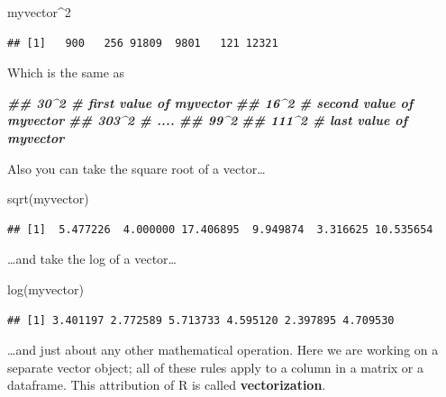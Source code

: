 \documentclass[
]{book}
\newenvironment{Shaded}{\begin{snugshade}}{\end{snugshade}}
\newcommand{\DecValTok}[1]{\textcolor[rgb]{0.00,0.00,0.81}{#1}}
\newcommand{\DocumentationTok}[1]{\textcolor[rgb]{0.56,0.35,0.01}{\textbf{\textit{#1}}}}
\newcommand{\FunctionTok}[1]{\textcolor[rgb]{0.00,0.00,0.00}{#1}}
\newcommand{\NormalTok}[1]{#1}
\newcommand{\SpecialCharTok}[1]{\textcolor[rgb]{0.00,0.00,0.00}{#1}}
\begin{document}
\begin{Shaded}
\begin{Highlighting}[]
\NormalTok{myvector}\SpecialCharTok{\^{}}\DecValTok{2}
\end{Highlighting}
\end{Shaded}

\begin{verbatim}
## [1]   900   256 91809  9801   121 12321
\end{verbatim}

Which is the same as

\begin{Shaded}
\begin{Highlighting}[]
\DocumentationTok{\#\# 30\^{}2    \# first value of myvector}
\DocumentationTok{\#\# 16\^{}2    \# second value of myvector}
\DocumentationTok{\#\# 303\^{}2   \# ....}
\DocumentationTok{\#\# 99\^{}2}
\DocumentationTok{\#\# 111\^{}2   \# last value of myvector}
\end{Highlighting}
\end{Shaded}

Also you can take the square root of a vector\ldots{}

\begin{Shaded}
\begin{Highlighting}[]
\FunctionTok{sqrt}\NormalTok{(myvector)}
\end{Highlighting}
\end{Shaded}

\begin{verbatim}
## [1]  5.477226  4.000000 17.406895  9.949874  3.316625 10.535654
\end{verbatim}

\ldots and take the log of a vector\ldots{}

\begin{Shaded}
\begin{Highlighting}[]
\FunctionTok{log}\NormalTok{(myvector)}
\end{Highlighting}
\end{Shaded}

\begin{verbatim}
## [1] 3.401197 2.772589 5.713733 4.595120 2.397895 4.709530
\end{verbatim}

\ldots and just about any other mathematical operation. Here we are working on a separate vector object; all of these rules apply to a column in a matrix or a dataframe. This attribution of R is called \textbf{vectorization}.
\end{document}
